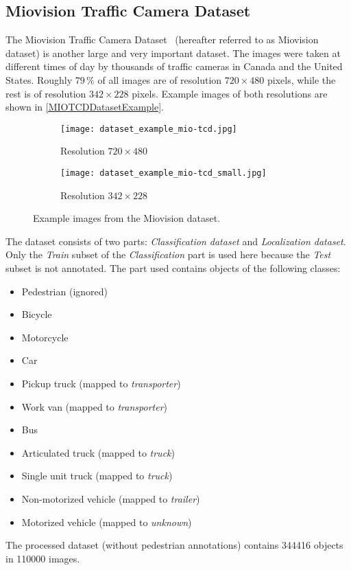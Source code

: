 \subsection{Miovision Traffic Camera Dataset}

The Miovision Traffic Camera Dataset~\cite{MIO2018} (hereafter referred to
as Miovision dataset) is another large and very important dataset. The images
were taken at different times of day by thousands of traffic cameras in Canada
and the United States. Roughly $79\,\%$ of all images are of resolution $720
\times 480$ pixels, while the rest is of
resolution $342 \times 228$ pixels. Example images of both resolutions are shown
in \autoref{MIOTCDDatasetExample}.

\begin{figure}[t]
    \centering
    \begin{subfigure}[b]{0.475\textwidth}
        \texttt{[image: dataset\_example\_mio-tcd.jpg]}
        \caption{Resolution $720 \times 480$}
    \end{subfigure}
    \begin{subfigure}[b]{0.475\textwidth}
        \texttt{[image: dataset\_example\_mio-tcd\_small.jpg]}
        \caption{Resolution $342 \times 228$}
    \end{subfigure}
    \caption{Example images from the Miovision dataset.}
    \label{MIOTCDDatasetExample}
\end{figure}

The dataset consists of two parts: \textit{Classification dataset} and
\textit{Localization dataset}. Only the \textit{Train} subset of the
\textit{Classification} part is used here because the \textit{Test} subset is
not annotated. The part used contains objects of the following classes:
\begin{itemize}
    \item Pedestrian (ignored)
    \item Bicycle
    \item Motorcycle
    \item Car
    \item Pickup truck (mapped to \textit{transporter})
    \item Work van (mapped to \textit{transporter})
    \item Bus
    \item Articulated truck (mapped to \textit{truck})
    \item Single unit truck (mapped to \textit{truck})
    \item Non-motorized vehicle (mapped to \textit{trailer})
    \item Motorized vehicle (mapped to \textit{unknown})
\end{itemize}
The processed dataset (without pedestrian annotations) contains \num{344416}
objects in \num{110000} images.


